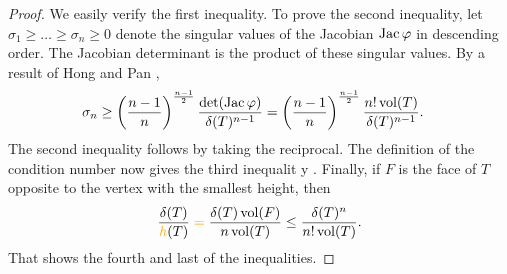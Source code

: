 \documentclass[10pt,letterpaper]{article}
\newcommand\cye[1]{%
  \protect\leavevmode
  \begingroup
    \color{red!35!yellow}%
    #1%
  \endgroup
}
\begin{document}
\begin{proof}
%     
    We easily verify the first inequality. To prove the second inequality, let $\sigma_1 \geq \dots \geq \sigma_n \geq 0$ denote the singular values of the Jacobian $\operatorname{{\rm Jac}}\varphi$ in descending order.
    The Jacobian determinant is the product of these singular values. 
    By a result of Hong and Pan \cite{hong1992lower},
    \begin{align}\label{equation:Hong_Pan}
        \sigma_{n}
        &\geq 
        \left( \frac{n-1}{n} \right)^{\frac{n-1}{2}}
        \frac{ \det(\operatorname{{\rm Jac}}\varphi) }{ {\delta}(T)^{n-1} }
        = 
        \left( \frac{n-1}{n} \right)^{\frac{n-1}{2}}
        \frac{ n! \operatorname{vol}(T) }{ {\delta}(T)^{n-1} }
        .
    \end{align}
    The second inequality follows by taking the reciprocal. 
    The definition of the condition number now gives the third inequalit\cye{y}. 
    Finally, 
    if $F$ is the face of $T$ opposite to the vertex with the smallest height, then 
    \begin{align*}
        \frac{ \diam(T) }{ \height(T) }
        \cye{=} 
        \frac{ \diam(T) \vol(F) }{ n \vol(T) }
        \leq 
        \frac{ \diam(T)^{n} }{ n! \vol(T) }
        .
    \end{align*}
    That shows the fourth and last of the inequalities. 
\end{proof}
\end{document}
